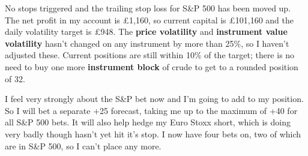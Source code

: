 No stops triggered and the trailing stop loss for S\&P 500 has been moved up. The net profit in my account is £1,160, so current capital is £101,160 and the daily volatility target is £948. The \textbf{price volatility} and \textbf{instrument value volatility} hasn't changed on any instrument by more than 25\%, so I haven't adjusted these. Current positions are still within 10\% of the target; there is no need to buy one more \textbf{instrument block} of crude to get to a rounded position of 32.

I feel very strongly about the S\&P bet now and I'm going to add to my position. So I will bet a separate +25 forecast, taking me up to the maximum of +40 for all S\&P 500 bets. It will also help hedge my Euro Stoxx short, which is doing very badly though hasn't yet hit it's stop. I now have four bets on, two of which are in S\&P 500, so I can't place any more.


